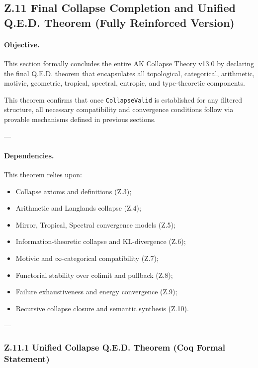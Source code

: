 \documentclass[11pt]{article}
\begin{document}
\subsection*{Z.11 Final Collapse Completion and Unified Q.E.D. Theorem (Fully Reinforced Version)}

\paragraph{Objective.}
This section formally concludes the entire AK Collapse Theory v13.0 by declaring the final Q.E.D. theorem that encapsulates all topological, categorical, arithmetic, motivic, geometric, tropical, spectral, entropic, and type-theoretic components.

This theorem confirms that once \texttt{CollapseValid} is established for any filtered structure, all necessary compatibility and convergence conditions follow via provable mechanisms defined in previous sections.

---

\paragraph{Dependencies.}
This theorem relies upon:

\begin{itemize}
    \item Collapse axioms and definitions (Z.3);
    \item Arithmetic and Langlands collapse (Z.4);
    \item Mirror, Tropical, Spectral convergence models (Z.5);
    \item Information-theoretic collapse and KL-divergence (Z.6);
    \item Motivic and $\infty$-categorical compatibility (Z.7);
    \item Functorial stability over colimit and pullback (Z.8);
    \item Failure exhaustiveness and energy convergence (Z.9);
    \item Recursive collapse closure and semantic synthesis (Z.10).
\end{itemize}

---

\subsubsection*{Z.11.1 Unified Collapse Q.E.D. Theorem (Coq Formal Statement)}
\end{document}
